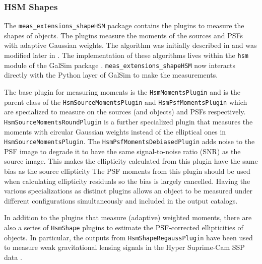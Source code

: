 \subsubsection{HSM Shapes}
\label{sec:hsm}

The \texttt{meas\_extensions\_shapeHSM} package contains the plugins to measure the shapes of objects.
The plugins measure the moments of the sources and PSFs with adaptive Gaussian weights.
The algorithm was initially described in \citet{2003MNRAS.343..459H} and was modified later in \citet{2005MNRAS.361.1287M}.
The implementation of these algorithms lives within the \texttt{hsm} module of the GalSim package \citep{2015A&C....10..121R}.
\texttt{meas\_extensions\_shapeHSM} now interacts directly with the Python layer of GalSim to make the measurements.

The base plugin for measuring moments is the \texttt{HsmMomentsPlugin} and is the parent class of the \texttt{HsmSourceMomentsPlugin} and \texttt{HsmPsfMomentsPlugin} which are specialized to measure on the sources (and objects) and PSFs respectively.
\texttt{HsmSourceMomentsRoundPlugin} is a further specialized plugin that measures the moments with circular Gaussian weights instead of the elliptical ones in \texttt{HsmSourceMomentsPlugin}.
The \texttt{HsmPsfMomentsDebiasedPlugin} adds noise to the PSF image to degrade it to have the same signal-to-noise ratio (SNR) as the source image.
This makes the ellipticity calculated from this plugin have the same bias as the source ellipticity
The PSF moments from this plugin should be used when calculating ellipticity residuals so the bias is largely cancelled.
Having the various specializations as distinct plugins allows an object to be measured under different configurations simultaneously and included in the output catalogs.

In addition to the plugins that measure (adaptive) weighted moments, there are also a series of \texttt{HsmShape} plugins to estimate the PSF-corrected ellipticities of objects.
In particular, the outputs from \texttt{HsmShapeRegaussPlugin} have been used to measure weak gravitational lensing signals in the Hyper Suprime-Cam SSP data \citep{2018PASJ...70S..25M, 2022PASJ...74..421L}.

